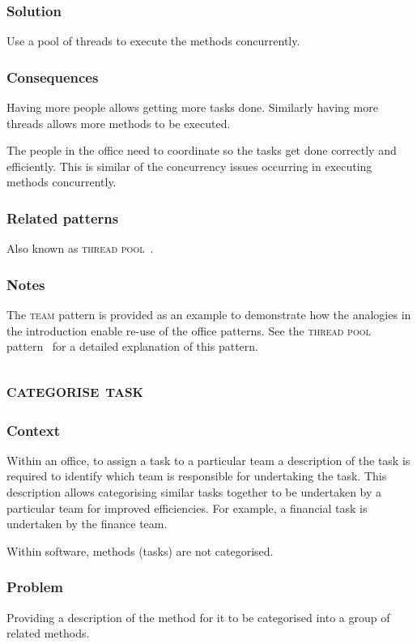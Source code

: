 \documentclass[prodmode]{style/acmlarge}
\begin{document}
\subsubsection*{Solution} Use a pool of threads to execute the methods
concurrently.

\subsubsection*{Consequences} Having more people allows getting more tasks done.
Similarly having more threads allows more methods to be executed.

The people in the office need to coordinate so the tasks get done correctly and
efficiently.  This is similar of the concurrency issues occurring in executing
methods concurrently.

\subsubsection*{Related patterns} Also known as \textsc{thread pool}~\cite{thread-per-request}.

\subsubsection*{Notes} The \textsc{team} pattern is provided as an example to
demonstrate how the analogies in the introduction enable re-use of the office
patterns. See the \textsc{thread pool} pattern~\cite{thread-per-request} for a
detailed explanation of this pattern.



\subsection{\textsc{\textbf{categorise task}}}

\subsubsection*{Context} Within an office, to assign a task to a particular team
a description of the task is required to identify which team is responsible for
undertaking the task.  This description allows categorising similar tasks
together to be undertaken by a particular team for improved efficiencies.  For
example, a financial task is undertaken by the finance team.

Within software, methods (tasks) are not categorised.

\subsubsection*{Problem} Providing a description of the method for it to be
categorised into a group of related methods.
\end{document}
